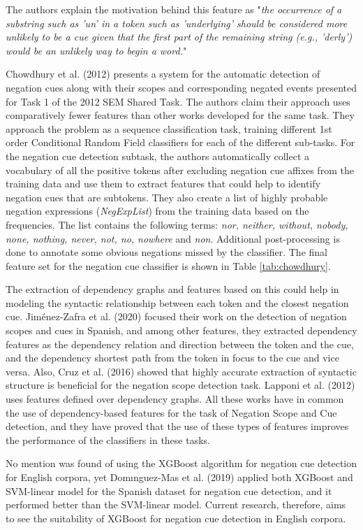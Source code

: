 The authors explain the motivation behind this feature as "\textit{the occurrence of a substring such as 'un' in a token such as 'underlying' should be considered more unlikely to be a cue given that the first part of the remaining string (e.g., 'derly') would be an unlikely way to begin a word.}"

Chowdhury et al. (2012) \cite{chowdhury2012fbk} presents a system for the automatic detection of negation cues along with their scopes and corresponding negated events presented for Task 1 of the 2012 SEM Shared Task. The authors claim their approach uses comparatively fewer features than other works developed for the same task. They approach the problem as a sequence classification task, training different 1st order Conditional Random Field classifiers for each of the different sub-tasks. 
For the negation cue detection subtask, the authors automatically collect a vocabulary of all the positive tokens after excluding negation cue affixes from the training data and use them to extract features that could help to identify negation cues that are subtokens. They also create a list of highly probable negation expressions (\textit{NegExpList}) from the training data based on the frequencies. The list contains the following terms: \textit{nor, neither, without, nobody, none, nothing, never, not, no, nowhere} and  \textit{non}. Additional post-processing is done to annotate some obvious negations missed by the classifier. The final feature set for the negation cue classifier is shown in Table \ref{tab:chowdhury}.

The extraction of dependency graphs and features based on this could help in modeling the syntactic relationship between each token and the closest negation cue. Jiménez-Zafra et al. (2020) \cite{jimenez2020detecting} focused their work on the detection of negation scopes and cues in Spanish, and among other features, they extracted dependency features as the dependency relation and direction between the token and the cue, and the dependency shortest path from the token in focus to the cue and vice versa. Also, Cruz et al. (2016) \cite{cruz2016machine} showed that highly accurate extraction of syntactic structure is beneficial for the negation scope detection task. Lapponi et al. (2012) \cite{lapponi2012uio} uses features defined over dependency graphs. All these works have in common the use of dependency-based features for the task of Negation Scope and Cue detection, and they have proved that the use of these types of features improves the performance of the classifiers in these tasks.

No mention was found of using the XGBoost algorithm for negation cue detection for English corpora, yet Domınguez-Mas et al. (2019) \cite{xgb2019} applied both XGBoost and SVM-linear model for the Spanish dataset for negation cue detection, and it performed better than the SVM-linear model. Current research, therefore, aims to see the suitability of XGBoost for negation cue detection in English corpora.